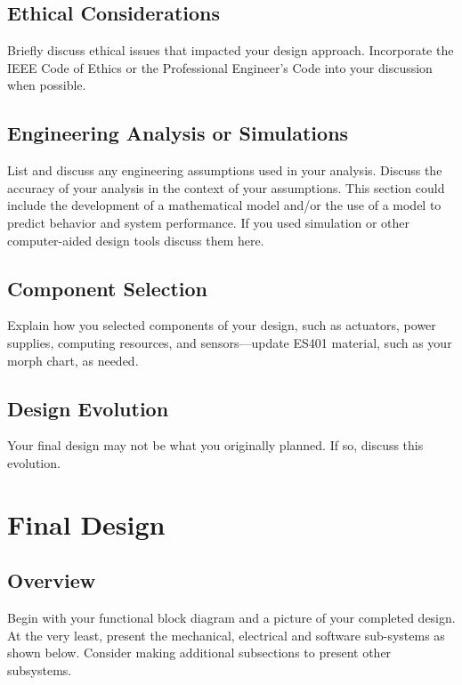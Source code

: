\documentclass{wrcecapstone}
\begin{document}
\subsection{Ethical Considerations}
Briefly discuss ethical issues that impacted your design approach.  Incorporate the IEEE Code of Ethics or the Professional Engineer’s Code into your discussion when possible. 

\subsection{Engineering Analysis or Simulations}
List and discuss any engineering assumptions used in your analysis.  Discuss the accuracy of your analysis in the context of your assumptions.
This section could include the development of a mathematical model and/or the use of a model to predict behavior and system performance.  If you used simulation or other computer-aided design tools discuss them here.
 
\subsection{Component Selection}
Explain how you selected components of your design, such as actuators, power supplies, computing resources, and sensors—update ES401 material, such as your morph chart, as needed.  

\subsection{Design Evolution}
Your final design may not be what you originally planned. If so, discuss this evolution.





\section{Final Design}

\subsection{Overview}
Begin with your functional block diagram and a picture of your completed design.   At the very least, present the mechanical, electrical and software sub-systems as shown below.  Consider making additional subsections to present other subsystems.   
\end{document}
